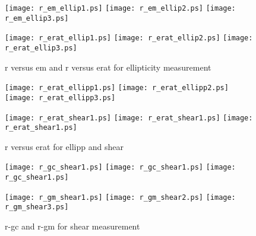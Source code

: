 \documentclass{article}
\begin{document}
\begin{figure}[htp]
\centering
\texttt{[image: r\_em\_ellip1.ps]}\quad
\texttt{[image: r\_em\_ellip2.ps]}\quad
\texttt{[image: r\_em\_ellip3.ps]}

\medskip

\texttt{[image: r\_erat\_ellip1.ps]}\quad
\texttt{[image: r\_erat\_ellip2.ps]}\quad
\texttt{[image: r\_erat\_ellip3.ps]}

\caption{r versus em and r versus erat for ellipticity measurement}
\label{pics:1}
\end{figure}




\clearpage{}
\begin{figure}[htp]
\centering
\texttt{[image: r\_erat\_ellipp1.ps]}\quad
\texttt{[image: r\_erat\_ellipp2.ps]}\quad
\texttt{[image: r\_erat\_ellipp3.ps]}

\medskip

\texttt{[image: r\_erat\_shear1.ps]}\quad
\texttt{[image: r\_erat\_shear1.ps]}\quad
\texttt{[image: r\_erat\_shear1.ps]}

\caption{r versus erat for ellipp and shear}
\label{pics:2}
\end{figure}




\clearpage{}
\begin{figure}[htp]
\centering
\texttt{[image: r\_gc\_shear1.ps]}\quad
\texttt{[image: r\_gc\_shear1.ps]}\quad
\texttt{[image: r\_gc\_shear1.ps]}

\medskip


\texttt{[image: r\_gm\_shear1.ps]}\quad
\texttt{[image: r\_gm\_shear2.ps]}\quad
\texttt{[image: r\_gm\_shear3.ps]}


\caption{r-gc and r-gm for shear measurement}
\label{pics:3}
\end{figure}
\end{document}
